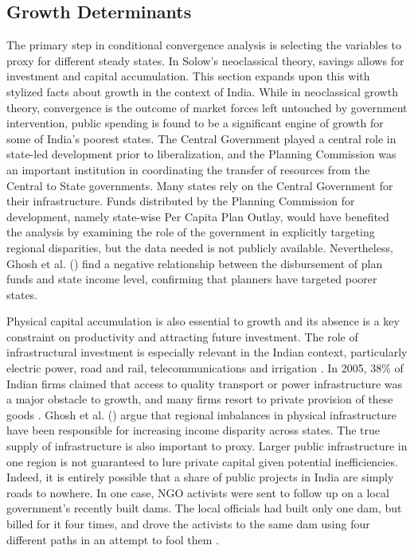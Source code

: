 \documentclass[a4paper, 11pt]{article}
\begin{document}
\subsection*{Growth Determinants}

	The primary step in conditional convergence analysis is selecting the variables to proxy for different steady states.  In Solow's neoclassical theory, savings allows for investment and capital accumulation.  This section expands upon this with stylized facts about growth in the context of India.  While in neoclassical growth theory, convergence is the outcome of market forces left untouched by government intervention, public spending is found to be a significant engine of growth for some of India’s poorest states.  The Central Government played a central role in state-led development prior to liberalization, and the Planning Commission was an important institution in coordinating the transfer of resources from the Central to State governments.  Many states rely on the Central Government for their infrastructure.  Funds distributed by the Planning Commission for development, namely state-wise Per Capita Plan Outlay, would have benefited the analysis by examining the role of the government in explicitly targeting regional disparities, but the data needed is not publicly available.  Nevertheless, Ghosh et al. (\citeyear{ghosh_economic_1998}) find a negative relationship between the disbursement of plan funds and state income level, confirming that planners have targeted poorer states.  \par
    Physical capital accumulation is also essential to growth and its absence is a key constraint on productivity and attracting future investment.  The role of infrastructural investment is especially relevant in the Indian context, particularly electric power, road and rail, telecommunications and irrigation \citep{baddeley_divergence_2006}.  In 2005, 38\% of Indian firms claimed that access to quality transport or power infrastructure was a major obstacle to growth, and many firms resort to private provision of these goods \citep{asher_politics_2013}.  Ghosh et al. (\citeyear{ghosh_economic_1998}) argue that regional imbalances in physical infrastructure have been responsible for increasing income disparity across states.  The true supply of infrastructure is also important to proxy.  Larger public infrastructure in one region is not guaranteed to lure private capital given potential inefficiencies.  Indeed, it is entirely possible that a share of public projects in India are simply roads to nowhere.  In one case, NGO activists were sent to follow up on a local government’s recently built dams.  The local officials had built only one dam, but billed for it four times, and drove the activists to the same dam using four different paths in an attempt to fool them \citep{pritchett_review_2009}.  \par
\end{document}
